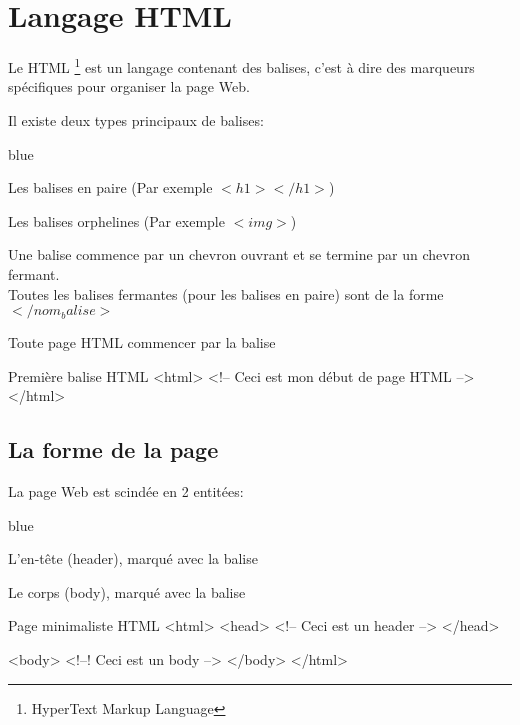\chapter{Langage HTML}

Le HTML \footnote{HyperText Markup Language} est un langage contenant des balises, c'est à dire des 
marqueurs spécifiques pour organiser la page Web.

Il existe deux types principaux de balises: 

\begin{items}{blue}{\Triangle}
\item Les balises en paire (Par exemple $<h1></h1>$)
\item Les balises orphelines (Par exemple $<img>$)
\end{items}

Une balise commence par un chevron ouvrant et se termine par un chevron fermant.\\
Toutes les balises fermantes (pour les balises en paire) sont de la forme $</nom_balise>$

Toute page HTML commencer par la balise 



\begin{Html}{Première balise HTML}
<html>
    <!-- Ceci est mon début de page HTML --> 
</html>
\end{Html}

\section{La forme de la page}

La page Web est scindée en 2 entitées: 

\begin{items}{blue}{\Triangle}
\item L'en-tête (header), marqué avec la balise 
\item Le corps (body), marqué avec la balise 
\end{items}

\begin{Html}{Page minimaliste HTML}
<html>
    <head>
        <!-- Ceci est un header --> 
    </head>

    <body>
        <!--! Ceci est un body -->
    </body>
</html>
\end{Html}


